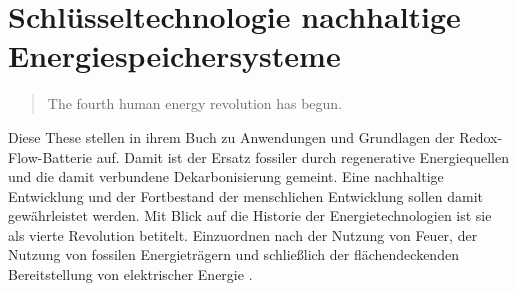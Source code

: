 
\chapter{Schlüsseltechnologie nachhaltige Energiespeichersysteme}
\label{sec:einleitung}

\begin{quote}\glqq The fourth human energy revolution has begun.\grqq~\cite{Zhan.2018}\end{quote} 

Diese These stellen \textcite{Zhan.2018} in ihrem Buch zu Anwendungen und Grundlagen der Redox-Flow-Batterie auf. Damit ist der Ersatz fossiler durch regenerative Energiequellen und die damit verbundene Dekarbonisierung gemeint. Eine nachhaltige Entwicklung und der Fortbestand der menschlichen Entwicklung sollen damit gewährleistet werden. Mit Blick auf die Historie der Energietechnologien ist sie als vierte Revolution betitelt. Einzuordnen nach der Nutzung von Feuer, der Nutzung von fossilen Energieträgern und schließlich der flächendeckenden Bereitstellung von elektrischer Energie \cite{Zhan.2018}.

